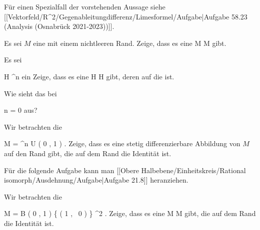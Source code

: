 Für einen Spezialfall der vorstehenden Aussage siehe
[[Vektorfeld/R^2/Gegenableitungdifferenz/Limesformel/Aufgabe|Aufgabe 58.23 (Analysis (Osnabrück 2021-2023))]].

{}
{

Es sei $M$ eine
mit einem nichtleeren Rand. Zeige, dass es eine
\maabb {} { M } { \partial M
} {}
gibt.

}
{} {}

{}
{

Es sei

\mavergleichskette
{\vergleichskette
{ H
}
{ \subseteq }{ \R^n
}
{  }{
}
{    }{
}
{   }{
}
}
{}{}{}
 {} {}
ein
Zeige, dass es eine
\maabbdisp {\varphi} { H } { \partial H
} {}
gibt, deren
auf
 die
ist.

}
{Wie sieht das bei

\mavergleichskette
{\vergleichskette
{ n
}
{ = }{ 0
}
{  }{
}
{    }{
}
{   }{
}
}
{}{}{}
aus?} {}

{}
{

Wir betrachten die

\mavergleichskette
{\vergleichskette
{ M
}
{ = }{ \R^n \setminus  U \left(   0 , 1  \right)
}
{  }{
}
{    }{
}
{   }{
}
}
{}{}{.}
Zeige, dass es eine stetig differenzierbare Abbildung von $M$ auf den Rand
 gibt, die auf dem Rand die Identität ist.

}
{} {}

Für die folgende Aufgabe kann man
[[Obere Halbebene/Einheitskreis/Rational isomorph/Ausdehnung/Aufgabe|Aufgabe 21.8]]
heranziehen.

{}
{

Wir betrachten die

\mavergleichskettedisp
{\vergleichskette
{ M
}
{ =} { B  \left(  0 , 1 \right) \setminus \{  \left(  1   , \,   0                   \right) \}
}
{ \subseteq} { \R^2
}
{ } {
}
{ } {
}
}
{}{}{.}
Zeige, dass es eine
\maabbdisp {\varphi} { M } { \partial M
} {}
gibt, die auf dem Rand die Identität ist.

}
{} {}

